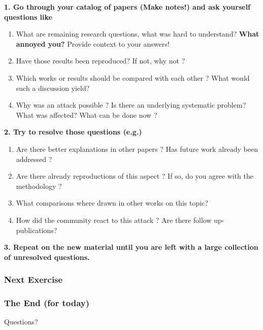 \documentclass{i20lecture}
\begin{document}
\begin{frame}
		
		\small
		\textbf{1. Go through your catalog of papers (\alert{Make notes!}) and ask yourself questions like}
		\begin{enumerate}[label=(\alph*)]
			\item{What are remaining research questions, what was hard to understand? \textbf{What annoyed you?} \alert{Provide context to your answers!}}
			\item{Have those results been reproduced? If not, why not ?}
			\item{Which works or results should be compared with each other ? What would such a discussion yield?}
			\item{Why was an attack possible ? Is there an underlying systematic problem? What was affected? What can be done now ?}
		\end{enumerate}

		\vspace{0.5cm}

		\textbf{2. Try to resolve those questions (e.g.)}
		\begin{enumerate}[label=(\alph*)]
			\item{Are there better explanations in other papers ? Has future work already been addressed ?}
			\item{Are there already reproductions of this aspect ? If so, do you agree with the methodology ?}
			\item{What comparisons where drawn in other works on this topic?}
			\item{How did the community react to this attack ? Are there follow up-publications?}
		\end{enumerate}

		\textbf{3. Repeat on the new material until you are left with a large \alert{collection of unresolved questions.}}
\end{frame}

\begin{frame}
	\frametitle{Next Exercise} 


\end{frame}

\begin{frame}
	\frametitle{The End (for today)}
	\begin{center}
		\Large Questions?
	\end{center}
\end{frame}
\end{document}
